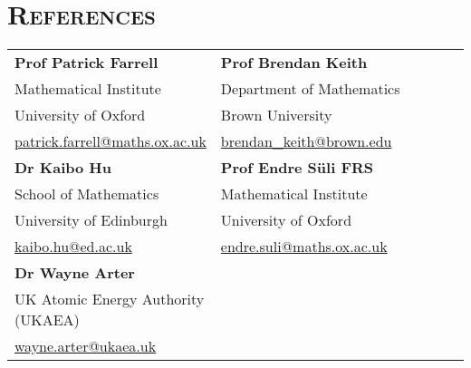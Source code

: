 \documentclass[12pt,a4paper,roman]{moderncv}
\begin{document}
\newpage


\section{\textsc{References}}


\hspace{26.5mm}
\begin{tabular}{p{0.4\linewidth} p{0.6\linewidth}}
    \textbf{Prof Patrick Farrell}  &  \textbf{Prof Brendan Keith}  \\
    Mathematical Institute  &  Department of Mathematics  \\
    University of Oxford  &  Brown University  \\
    \href{mailto:patrick.farrell@maths.ox.ac.uk}{patrick.farrell@maths.ox.ac.uk}  &  \href{mailto:brendan_keith@brown.edu}{brendan\_keith@brown.edu}  \\
    \vspace{1mm}\textbf{Dr Kaibo Hu}  &  \vspace{1mm}\textbf{Prof Endre Süli FRS}  \\
    School of Mathematics  &  Mathematical Institute  \\
    University of Edinburgh  &  University of Oxford  \\
    \href{mailto:kaibo.hu@ed.ac.uk}{kaibo.hu@ed.ac.uk}  &  \href{mailto:endre.suli@maths.ox.ac.uk}{endre.suli@maths.ox.ac.uk}  \\
    \vspace{1mm}\textbf{Dr Wayne Arter}  &  \\
    UK Atomic Energy Authority (UKAEA)  &  \\
    \href{mailto:wayne.arter@ukaea.uk}{wayne.arter@ukaea.uk}  &  
\end{tabular}
\end{document}
